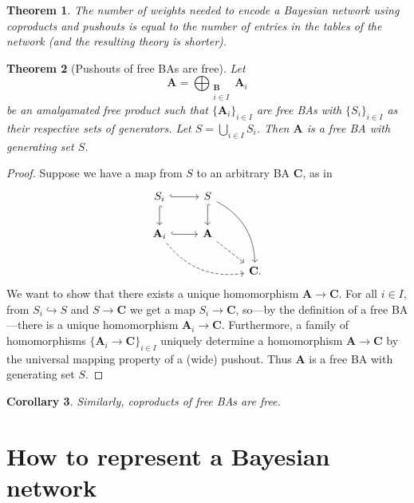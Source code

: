 \documentclass{article}
\newtheorem{theorem}{Theorem}
\newtheorem{corollary}[theorem]{Corollary}
\theoremstyle{definition}
\theoremstyle{remark}
\begin{document}
\begin{theorem}
  The number of weights needed to encode a Bayesian network using
  coproducts and pushouts is equal to the number of entries in the tables of the
  network (and the resulting theory is shorter).
\end{theorem}

\begin{theorem}[Pushouts of free BAs are free]
  Let
  \[
    \mathbf{A} = \bigoplus_{\substack{\mathbf{B}\\ i \in I}} \mathbf{A}_i
  \]
  be an amalgamated free product such that $\{ \mathbf{A}_{i} \}_{i \in I}$ are
  free BAs with $\{ S_i \}_{i \in I}$ as their respective sets of generators.
  Let $S = \bigcup_{i \in I} S_i$. Then $\mathbf{A}$ is a free BA with
  generating set $S$.
\end{theorem}
\begin{proof}
  Suppose we have a map from $S$ to an arbitrary BA $\mathbf{C}$, as in
  \[
    \begin{tikzcd}
      S_i \ar[r,hookrightarrow] \ar[d,hookrightarrow] & S \ar[d,hookrightarrow]
      \ar[ddr,bend left] & \\
      \mathbf{A}_i \ar[r,hookrightarrow] \ar[rrd,dashed,bend right] & \mathbf{A}
      \ar[rd,dashed]& \\
      & & \mathbf{C}.
    \end{tikzcd}
  \]
  We want to show that there exists a unique homomorphism $\mathbf{A} \to
  \mathbf{C}$. For all $i \in I$, from $S_i \hookrightarrow S$ and $S \to
  \mathbf{C}$ we get a map $S_i \to \mathbf{C}$, so---by the definition of a
  free BA---there is a unique homomorphism $\mathbf{A}_i \to \mathbf{C}$.
  Furthermore, a family of homomorphisms $\{ \mathbf{A}_i \to \mathbf{C} \}_{i
    \in I}$ uniquely determine a homomorphism $\mathbf{A} \to \mathbf{C}$ by the
  universal mapping property of a (wide) pushout. Thus $\mathbf{A}$ is a free BA
  with generating set $S$.
\end{proof}

\begin{corollary}
  Similarly, coproducts of free BAs are free.
\end{corollary}

\section{How to represent a Bayesian network}
\end{document}
